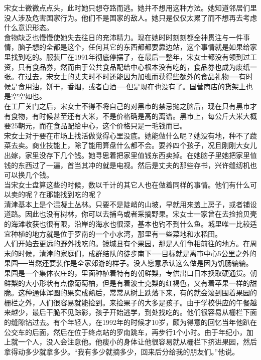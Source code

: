 宋女士微微点点头，此时她只想夺路而逃。她并不想用这种方法。她知道邻居们里没人涉及危害国家行为。他们不是国家的敌人。她只是仅仅太累了而不想再去考虑什么意识形态。\\

食物缺乏也慢慢使她失去往日的充沛精力。现在她时时刻刻都全神贯注与一件事情，脑子想的全都是这个，任何其它的东西都都要靠边站，这个事情就是如果给家里找到吃的。服装厂在1991年彻底停摆了，在最后一整年，宋女士都没有领到过工资，只有食品券，然而由于公共食品配给中心根本没有吃的，食品券也成为废纸一张。在过去，宋女士的丈夫时不时还能因为加班而获得些额外的食品礼物──有时候是食用油，饼干，香烟，或者白酒──但是现在也没有了。国营商店的货架上也是空空如也。\\

在工厂关门之后，宋女士不得不将自己的对黑市的禁忌抛之脑后，现在只有黑市才有食物，有时候甚至还有大米，不是价格确是高的离谱。黑市上，每公斤大米大概要25朝元，而在食品配给中心，这个价格只是一毛钱而已。\\

宋女士对于要在市场上找活做觉得心里没底。她能做什么呢？她没有地，种不了蔬菜去卖。商业技能上，除了能用算盘什么都不会。要养四个孩子，况且刚刚大女儿出嫁，家里没存下几个钱。她寻思着把家里值钱东西卖掉。在她脑子里她把家里值钱的东西过了一遍，首当其冲的就是电视。然后是丈夫的那些存书，兴许缝纫机也可以换几个钱。\\

当宋女士盘算这些的时候，数以千计的其它人也在做着同样的事情。他们有什么可以卖的呢？在那能找到吃的呢？\\

清津基本上是个混凝土丛林。只要不是陡峭的山坡，早就用来盖上房子，或者铺设道路。因此也没有树林，你可以去捕鸟或者采摘野果。宋女士一家曾在去捡拾贝壳的海滩收获也很有限，沿岸的海水也很深，基本也钓不到什么鱼。城里唯一比较适宜种植的地方就是位于罗南的一个小水湾，那里有一些菜地和水稻田。\\

人们开始去更远的野外找吃的。镜城县有个果园，那是人们争相前往的地方。在周末的时候，清津的家庭们，成群结队的徒步南下──目标就是离市中心5公里之外的果园──当然还要装作是全家郊游的样子。没人愿意承认这么做是因为饥肠辘辘。果园是一个集体农庄的，里面种植着特有的朝鲜梨，专供出口日本换取硬通货。朝鲜梨的大小形状有点像葡萄柚，但是有着波士克梨的红褐色，又有着苹果一样的甜脆。这种通体浑圆的果实成熟后，常常从树上跌落下来，有的就会滚到围着果园的栅栏之外，人们很容易就能捡到。来捡果子的大多是孩子。由于学校供应的午餐越来越少，最后干脆不见踪影，孩子开始逃学，到处找吃的。他们很容易从栅栏下面的缝隙钻过去。有个年轻人，在1992年的时候才10岁，颇为得意的回忆当年他趴在公交车的后面，然后在位于终点站的罗南跳车，再步行1个小时。由于年纪小，加上就一个人，没人会注意他。他瘦小的身体让他很容易就从栅栏下挤进果园，然后拿得动多少就拿多少。“我有多少就摘多少，回来后分给我的朋友们。”他说。\\

